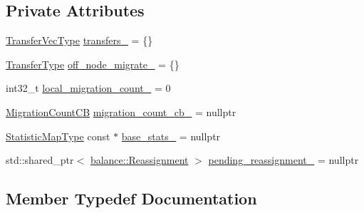 \subsection*{Private Attributes}
\begin{DoxyCompactItemize}
\item 
\hyperlink{structvt_1_1vrt_1_1collection_1_1lb_1_1_base_l_b_a329e8179ec41a1bd4924c79fe23a79af}{Transfer\+Vec\+Type} \hyperlink{structvt_1_1vrt_1_1collection_1_1lb_1_1_base_l_b_a815315640fe4e41e39d1872e115b8574}{transfers\+\_\+} = \{\}
\item 
\hyperlink{structvt_1_1vrt_1_1collection_1_1lb_1_1_base_l_b_a0a5f834082d85c558bdaf84c464c1ead}{Transfer\+Type} \hyperlink{structvt_1_1vrt_1_1collection_1_1lb_1_1_base_l_b_aa6e16e52738ab5d6f85be39641db94bd}{off\+\_\+node\+\_\+migrate\+\_\+} = \{\}
\item 
int32\+\_\+t \hyperlink{structvt_1_1vrt_1_1collection_1_1lb_1_1_base_l_b_ae2beaf58c52b6ac2ccca8ab0c266f203}{local\+\_\+migration\+\_\+count\+\_\+} = 0
\item 
\hyperlink{structvt_1_1vrt_1_1collection_1_1lb_1_1_base_l_b_aba7198eb30aef1b19c1f1efdea760543}{Migration\+Count\+CB} \hyperlink{structvt_1_1vrt_1_1collection_1_1lb_1_1_base_l_b_a7e0feda368b0cc0df0828a73c3b75883}{migration\+\_\+count\+\_\+cb\+\_\+} = nullptr
\item 
\hyperlink{structvt_1_1vrt_1_1collection_1_1lb_1_1_base_l_b_acd9bdad961ac83c96b7a227de672f96c}{Statistic\+Map\+Type} const  $\ast$ \hyperlink{structvt_1_1vrt_1_1collection_1_1lb_1_1_base_l_b_aae83b83b87e2dea3d44861bd3fb1fde8}{base\+\_\+stats\+\_\+} = nullptr
\item 
std\+::shared\+\_\+ptr$<$ \hyperlink{structvt_1_1vrt_1_1collection_1_1balance_1_1_reassignment}{balance\+::\+Reassignment} $>$ \hyperlink{structvt_1_1vrt_1_1collection_1_1lb_1_1_base_l_b_ab80f56f3a1930dcb5ea58a813145bc39}{pending\+\_\+reassignment\+\_\+} = nullptr
\end{DoxyCompactItemize}


\subsection{Member Typedef Documentation}
\mbox{\label{structvt_1_1vrt_1_1collection_1_1lb_1_1_base_l_b_a83eb4daec14edfb8780422e95b8e38d3}} 
